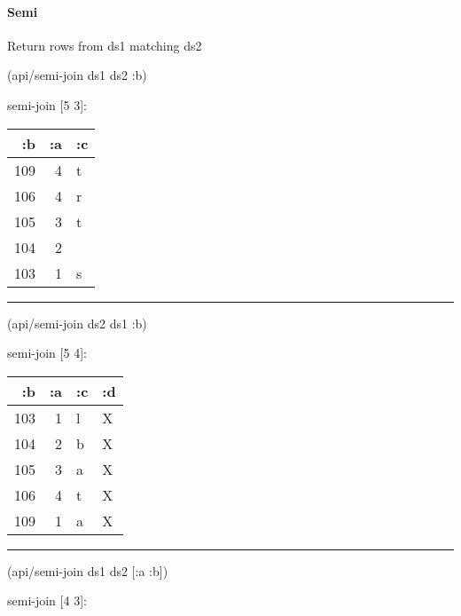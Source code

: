 \documentclass[]{article}
\newenvironment{Shaded}{\begin{snugshade}}{\end{snugshade}}
\newcommand{\AttributeTok}[1]{\textcolor[rgb]{0.77,0.63,0.00}{#1}}
\newcommand{\NormalTok}[1]{#1}
\let\oldparagraph\paragraph
\renewcommand{\paragraph}[1]{\oldparagraph{#1}\mbox{}}
\begin{document}
\paragraph{Semi}\label{semi}

Return rows from ds1 matching ds2

\begin{Shaded}
\begin{Highlighting}[]
\NormalTok{(api/semi-join ds1 ds2 }\AttributeTok{:b}\NormalTok{)}
\end{Highlighting}
\end{Shaded}

semi-join {[}5 3{]}:

\begin{longtable}[]{@{}rrl@{}}
\toprule
:b & :a & :c\tabularnewline
\midrule
\endhead
109 & 4 & t\tabularnewline
106 & 4 & r\tabularnewline
105 & 3 & t\tabularnewline
104 & 2 &\tabularnewline
103 & 1 & s\tabularnewline
\bottomrule
\end{longtable}

\begin{center}\rule{0.5\linewidth}{0.5pt}\end{center}

\begin{Shaded}
\begin{Highlighting}[]
\NormalTok{(api/semi-join ds2 ds1 }\AttributeTok{:b}\NormalTok{)}
\end{Highlighting}
\end{Shaded}

semi-join {[}5 4{]}:

\begin{longtable}[]{@{}rrll@{}}
\toprule
:b & :a & :c & :d\tabularnewline
\midrule
\endhead
103 & 1 & l & X\tabularnewline
104 & 2 & b & X\tabularnewline
105 & 3 & a & X\tabularnewline
106 & 4 & t & X\tabularnewline
109 & 1 & a & X\tabularnewline
\bottomrule
\end{longtable}

\begin{center}\rule{0.5\linewidth}{0.5pt}\end{center}

\begin{Shaded}
\begin{Highlighting}[]
\NormalTok{(api/semi-join ds1 ds2 [}\AttributeTok{:a} \AttributeTok{:b}\NormalTok{])}
\end{Highlighting}
\end{Shaded}

semi-join {[}4 3{]}:
\end{document}
